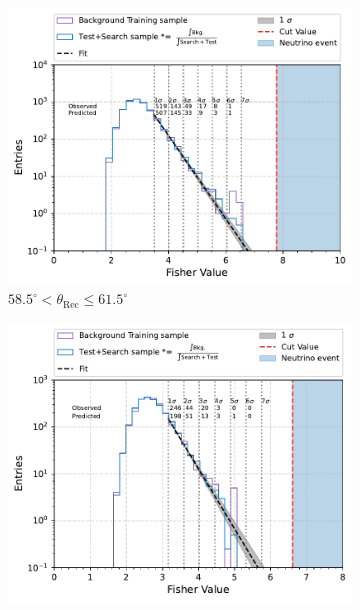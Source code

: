 \begin{figure}[h!]
  \centering
   \begin{subfigure}[l]{.48\textwidth}
     \centering
     \includegraphics[width=\linewidth]{thesis_figures/Nu_analysis/Fisher_plots/Fisher_fit_search+test_bkg_region_58.5_61.5.pdf}
     \caption{$ 58.5^{\circ} <\theta_{\text{Rec}} \leq 61.5^{\circ}$}
     \label{fig:58.5-61.5}
   \end{subfigure}
   \begin{subfigure}[r]{.48\textwidth}
     \centering
     \includegraphics[width=\linewidth]{thesis_figures/Nu_analysis/Fisher_plots/Fisher_fit_search+test_bkg_region_61.5_64.5.pdf}

\end{subfigure}
\end{figure}
